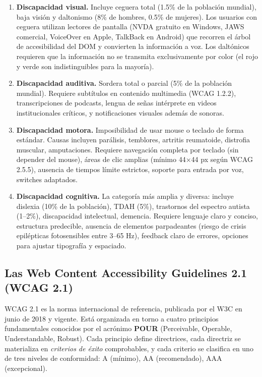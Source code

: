\begin{enumerate}
\item \textbf{Discapacidad visual.} Incluye ceguera total (1.5\% de
la población mundial), baja visión y daltonismo (8\% de hombres,
0.5\% de mujeres). Los usuarios con ceguera utilizan lectores de
pantalla (NVDA gratuito en Windows, JAWS comercial, VoiceOver en
Apple, TalkBack en Android) que recorren el árbol de accesibilidad
del DOM y convierten la información a voz. Los daltónicos requieren
que la información no se transmita exclusivamente por color (el rojo
y verde son indistinguibles para la mayoría).

\item \textbf{Discapacidad auditiva.} Sordera total o parcial (5\% de
la población mundial). Requiere subtítulos en contenido multimedia
(WCAG 1.2.2), transcripciones de podcasts, lengua de señas
intérprete en videos institucionales críticos, y notificaciones
visuales además de sonoras.

\item \textbf{Discapacidad motora.} Imposibilidad de usar mouse o
teclado de forma estándar. Causas incluyen parálisis, temblores,
artritis reumatoide, distrofia muscular, amputaciones. Requiere
navegación completa por teclado (sin depender del mouse), áreas de
clic amplias (mínimo 44$\times$44 px según WCAG 2.5.5), ausencia de
tiempos límite estrictos, soporte para entrada por voz, switches
adaptados.

\item \textbf{Discapacidad cognitiva.} La categoría más amplia y
diversa: incluye dislexia (10\% de la población), TDAH (5\%),
trastornos del espectro autista (1--2\%), discapacidad intelectual,
demencia. Requiere lenguaje claro y conciso, estructura predecible,
ausencia de elementos parpadeantes (riesgo de crisis epilépticas
fotosensibles entre 3--65 Hz), feedback claro de errores, opciones
para ajustar tipografía y espaciado.
\end{enumerate}

\subsection{Las Web Content Accessibility Guidelines 2.1 (WCAG 2.1)}

WCAG 2.1 \cite{w3c2018wcag} es la norma internacional de referencia,
publicada por el W3C en junio de 2018 y vigente. Está organizada en
torno a cuatro principios fundamentales conocidos por el acrónimo
\textbf{POUR} (Perceivable, Operable, Understandable, Robust). Cada
principio define directrices, cada directriz se materializa en
\emph{criterios de éxito} comprobables, y cada criterio se clasifica
en uno de tres niveles de conformidad: A (mínimo), AA (recomendado),
AAA (excepcional).

